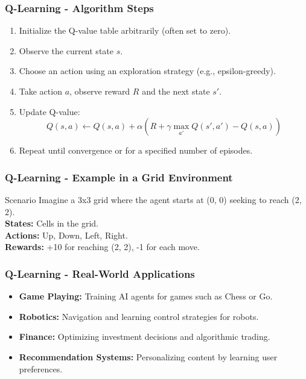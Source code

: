 \documentclass[aspectratio=169]{beamer}
\begin{document}
\begin{frame}[fragile]
    \frametitle{Q-Learning - Algorithm Steps}
    \begin{enumerate}
        \item Initialize the Q-value table arbitrarily (often set to zero).
        \item Observe the current state $s$.
        \item Choose an action using an exploration strategy (e.g., epsilon-greedy).
        \item Take action $a$, observe reward $R$ and the next state $s'$.
        \item Update Q-value:
            \begin{equation}
            Q(s, a) \leftarrow Q(s, a) + \alpha \left( R + \gamma \max_{a'} Q(s', a') - Q(s, a) \right)
            \end{equation}
        \item Repeat until convergence or for a specified number of episodes.
    \end{enumerate}
\end{frame}

\begin{frame}[fragile]
    \frametitle{Q-Learning - Example in a Grid Environment}
    \begin{block}{Scenario}
        Imagine a 3x3 grid where the agent starts at (0, 0) seeking to reach (2, 2).\\
        \textbf{States:} Cells in the grid.\\
        \textbf{Actions:} Up, Down, Left, Right.\\
        \textbf{Rewards:} +10 for reaching (2, 2), -1 for each move.
    \end{block}
\end{frame}

\begin{frame}[fragile]
    \frametitle{Q-Learning - Real-World Applications}
    \begin{itemize}
        \item \textbf{Game Playing:} Training AI agents for games such as Chess or Go.
        \item \textbf{Robotics:} Navigation and learning control strategies for robots.
        \item \textbf{Finance:} Optimizing investment decisions and algorithmic trading.
        \item \textbf{Recommendation Systems:} Personalizing content by learning user preferences.
    \end{itemize}
\end{frame}
\end{document}
